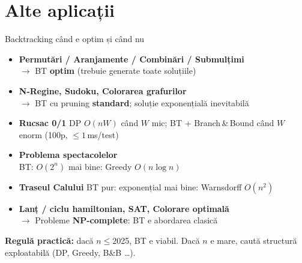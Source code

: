﻿\documentclass[10pt]{beamer}
\begin{document}
\section{Alte aplicații}

\begin{frame}{Backtracking \textemdash{} când e optim și când nu}
  \begin{itemize}\itemsep2pt
    \item \textbf{Permutări / Aranjamente / Combinări / Submulțimi}\\
      \hspace{1em}$\rightarrow$ BT \textbf{optim} (trebuie generate toate soluțiile)

    \item \textbf{N-Regine, Sudoku, Colorarea grafurilor}\\
      \hspace{1em}$\rightarrow$ BT cu pruning \textbf{standard}; soluție exponențială inevitabilă

    \item \textbf{Rucsac 0/1} \textemdash{} DP $O(nW)$ când $W$ mic;
      \alert{BT + Branch\,\&\,Bound} când $W$ enorm (100p, $\leq 1\,$ms/test)

    \item \textbf{Problema spectacolelor}\\
      \hspace{1em}BT: $O(2^n)$ \hfill \alert{mai bine: Greedy $O(n \log n)$}

    \item \textbf{Traseul Calului} \textemdash{} BT pur: exponențial
      \hfill \alert{mai bine: Warnsdorff $O(n^2)$}

    \item \textbf{Lanț / ciclu hamiltonian, SAT, Colorare optimală}\\
      \hspace{1em}$\rightarrow$ Probleme \textbf{NP-complete}: BT e abordarea clasică
  \end{itemize}
  \textbf{Regulă practică:} dacă $n \leq 20$\textendash{}25, BT e viabil.
  Dacă $n$ e mare, caută structură exploatabilă (DP, Greedy, B\&B \ldots).
\end{frame}
\end{document}
